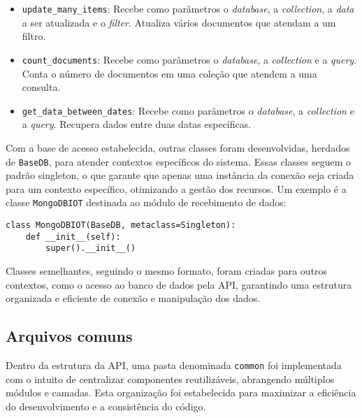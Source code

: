 \begin{itemize}
    \item \texttt{update\_many\_items}: Recebe como parâmetros o \textit{database}, a \textit{collection}, a \textit{data} a ser atualizada e o \textit{filter}. Atualiza vários documentos que atendam a um filtro.
    
    \item \texttt{count\_documents}: Recebe como parâmetros o \textit{database}, a \textit{collection} e a \textit{query}. Conta o número de documentos em uma coleção que atendem a uma consulta.
    
    \item \texttt{get\_data\_between\_dates}: Recebe como parâmetros o \textit{database}, a \textit{collection} e a \textit{query}. Recupera dados entre duas datas específicas.
\end{itemize}


Com a base de acesso estabelecida, outras classes foram desenvolvidas, herdados de \texttt{BaseDB}, para atender contextos específicos do sistema. Essas classes seguem o padrão singleton, o que garante que apenas uma instância da conexão seja criada para um contexto específico, otimizando a gestão dos recursos. Um exemplo é a classe \texttt{MongoDBIOT} destinada ao módulo de recebimento de dados:

\begin{verbatim}
class MongoDBIOT(BaseDB, metaclass=Singleton):
    def __init__(self):
        super().__init__()
\end{verbatim}

Classes semelhantes, seguindo o mesmo formato, foram criadas para outros contextos, como o acesso ao banco de dados pela API, garantindo uma estrutura organizada e eficiente de conexão e manipulação dos dados.

\subsection{Arquivos comuns}\label{subsec:commum}

Dentro da estrutura da API, uma pasta denominada \texttt{common} foi implementada com o intuito de centralizar componentes reutilizáveis, abrangendo múltiplos módulos e camadas. Esta organização foi estabelecida para maximizar a eficiência do desenvolvimento e a consistência do código.

